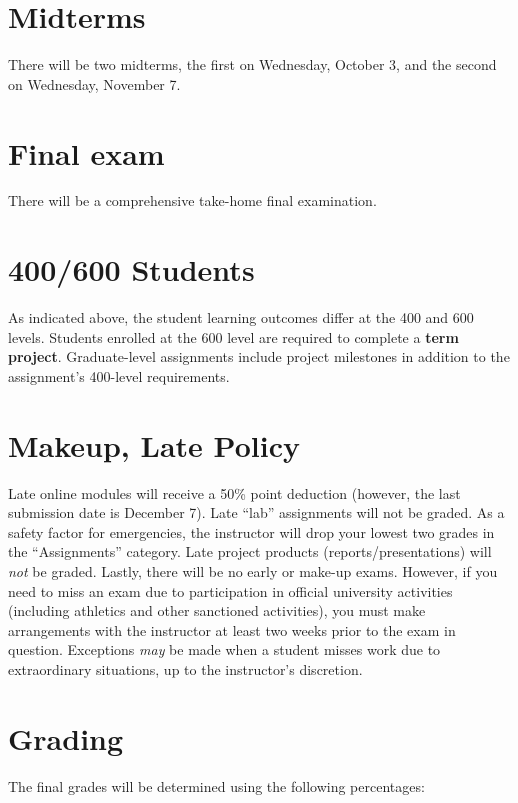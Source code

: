 \documentclass[11pt,onecolumn]{article}
\begin{document}
\section*{Midterms}
There will be two midterms, the first on Wednesday, October 3, and the second on Wednesday, November 7.

\section*{Final exam}
There will be a comprehensive take-home final examination.

\section*{400/600 Students}
As indicated above, the student learning outcomes differ at the 400 and 600 levels. Students enrolled at the 600 level are required to complete a \textbf{term project}. Graduate-level assignments include project milestones in addition to the assignment's 400-level requirements.

\section*{Makeup, Late Policy}
Late online modules will receive a 50\% point deduction (however, the last submission date is December 7). Late ``lab'' assignments will not be graded. As a safety factor for emergencies, the instructor will drop your lowest two grades in the ``Assignments'' category. Late project products (reports/presentations) will \textit{not} be graded. Lastly, there will be no early or make-up exams. However, if you need to miss an exam due to participation in official university activities (including athletics and other sanctioned activities), you must make arrangements with the instructor at least two weeks prior to the exam in question. Exceptions \textit{may} be made when a student misses work due to extraordinary situations, up to the instructor's discretion.

\newpage
\section*{Grading}
The final grades will be determined using the following percentages:
\end{document}
